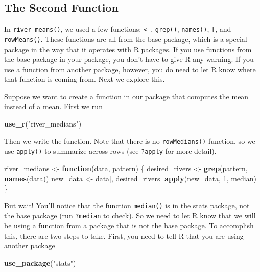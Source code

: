 \documentclass[
]{book}
\newenvironment{Shaded}{\begin{snugshade}}{\end{snugshade}}
\newcommand{\ControlFlowTok}[1]{\textcolor[rgb]{0.13,0.29,0.53}{\textbf{#1}}}
\newcommand{\DecValTok}[1]{\textcolor[rgb]{0.00,0.00,0.81}{#1}}
\newcommand{\KeywordTok}[1]{\textcolor[rgb]{0.13,0.29,0.53}{\textbf{#1}}}
\newcommand{\NormalTok}[1]{#1}
\newcommand{\StringTok}[1]{\textcolor[rgb]{0.31,0.60,0.02}{#1}}
\begin{document}
\hypertarget{the-second-function}{%
\subsection{The Second Function}\label{the-second-function}}

In \texttt{river\_means()}, we used a few functions: \texttt{\textless{}-}, \texttt{grep()}, \texttt{names()}, \texttt{{[}}, and \texttt{rowMeans()}. These functions are all from the base package, which is a special package in the way that it operates with R packages. If you use functions from the base package in your package, you don't have to give R any warning. If you use a function from another package, however, you do need to let R know where that function is coming from. Next we explore this.

Suppose we want to create a function in our package that computes the mean instead of a mean. First we run

\begin{Shaded}
\begin{Highlighting}[]
\KeywordTok{use_r}\NormalTok{(}\StringTok{"river_medians"}\NormalTok{)}
\end{Highlighting}
\end{Shaded}

Then we write the function. Note that there is no \texttt{rowMedians()} function, so we use \texttt{apply()} to summarize across rows (see \texttt{?apply} for more detail).

\begin{Shaded}
\begin{Highlighting}[]
\NormalTok{river_medians <-}\StringTok{ }\ControlFlowTok{function}\NormalTok{(data, pattern) \{}
\NormalTok{  desired_rivers <-}\StringTok{ }\KeywordTok{grep}\NormalTok{(pattern, }\KeywordTok{names}\NormalTok{(data))}
\NormalTok{  new_data <-}\StringTok{ }\NormalTok{data[, desired_rivers]}
  \KeywordTok{apply}\NormalTok{(new_data, }\DecValTok{1}\NormalTok{, median)}
\NormalTok{\}}
\end{Highlighting}
\end{Shaded}

But wait! You'll notice that the function \texttt{median()} is in the stats package, not the base package (run \texttt{?median} to check). So we need to let R know that we will be using a function from a package that is not the base package. To accomplish this, there are two steps to take. First, you need to tell R that you are using another package

\begin{Shaded}
\begin{Highlighting}[]
\KeywordTok{use_package}\NormalTok{(}\StringTok{"stats"}\NormalTok{)}
\end{Highlighting}
\end{Shaded}
\end{document}
